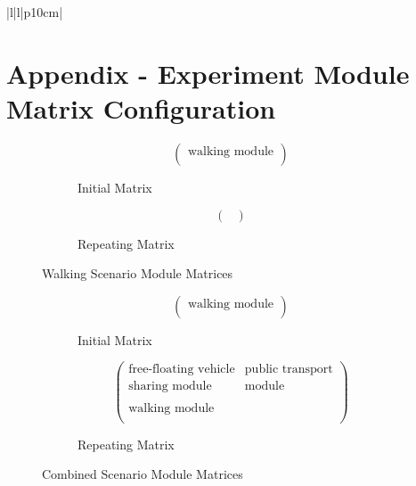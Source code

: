 \begin{table}[ht]
\begin{tabular}{|l|l|p{10cm}|}
\end{tabular}
\normalsize
\end{table}

\clearpage
\section{Appendix - Experiment Module Matrix Configuration}
\label{app:experiment_module_matrix_configuration}


\begin{figure}[ht]
    \centering
    \begin{subfigure}{0.45\linewidth}
        \centering
        \[
        \begin{pmatrix}
            \text{walking module} \\
        \end{pmatrix}
        \]
        \caption{Initial Matrix}
    \end{subfigure}
    \hfill
    \begin{subfigure}{0.45\linewidth}
        \centering
        \[
        \begin{pmatrix}
            \\
        \end{pmatrix}
        \]
        \caption{Repeating Matrix}
    \end{subfigure}
    \caption{Walking Scenario Module Matrices}
    \label{fig:walking_scenario_module_matrix}
\end{figure}


\begin{figure}[ht]
    \centering
    \begin{subfigure}{0.45\linewidth}
        \centering
        \[
        \begin{pmatrix}
            \text{walking module} \\
        \end{pmatrix}
        \]
        \caption{Initial Matrix}
    \end{subfigure}
    \hfill
    \begin{subfigure}{0.45\linewidth}
        \centering
        \[
        \begin{pmatrix}
            \text{free-floating vehicle} & \text{public transport} \\
            \text{sharing module} & \text{module} \\
            \\
            \text{walking module} & \\
        \end{pmatrix}
        \]
        \caption{Repeating Matrix}
    \end{subfigure}
    \caption{Combined Scenario Module Matrices}
    \label{fig:combined_scenario_module_matrix}
\end{figure}

